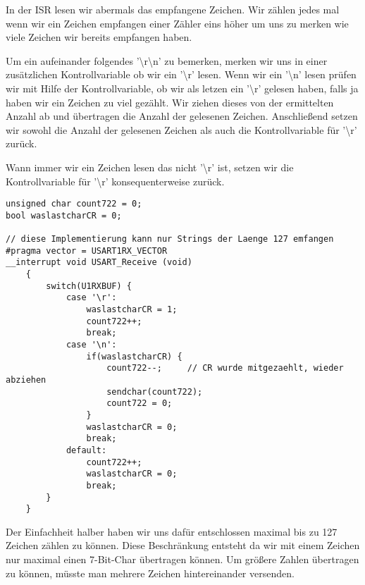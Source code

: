 \documentclass[11pt,a4paper,ngerman]{article}
\begin{document}
\begin{description}
In der ISR lesen wir abermals das empfangene Zeichen. 
Wir zählen jedes mal wenn wir ein Zeichen empfangen einer Zähler eins höher um uns zu merken wie
viele Zeichen wir bereits empfangen haben.

Um ein aufeinander folgendes '\textbackslash r\textbackslash n' zu bemerken, merken wir uns in einer zusätzlichen Kontrollvariable ob wir ein '\textbackslash r' lesen.
Wenn wir ein '\textbackslash n' lesen prüfen wir mit Hilfe der Kontrollvariable, ob wir als letzen ein '\textbackslash r' gelesen haben, falls ja haben wir
ein Zeichen zu viel gezählt. Wir ziehen dieses von der ermittelten Anzahl ab und übertragen die Anzahl der gelesenen 
Zeichen. Anschließend setzen wir sowohl die Anzahl der gelesenen Zeichen als auch die Kontrollvariable für '\textbackslash r' zurück.

Wann immer wir ein Zeichen lesen das nicht '\textbackslash r' ist, setzen wir die Kontrollvariable für '\textbackslash r' konsequenterweise zurück.
\begin{lstlisting}
unsigned char count722 = 0;
bool waslastcharCR = 0;

// diese Implementierung kann nur Strings der Laenge 127 emfangen
#pragma vector = USART1RX_VECTOR
__interrupt void USART_Receive (void)
	{
		switch(U1RXBUF) {
			case '\r':
				waslastcharCR = 1;
				count722++;
				break;
			case '\n':
				if(waslastcharCR) {
					count722--;		// CR wurde mitgezaehlt, wieder abziehen
					sendchar(count722);
					count722 = 0;
				}
				waslastcharCR = 0;
				break;
			default:
				count722++;
				waslastcharCR = 0;
				break;
		}
	} 
\end{lstlisting}
Der Einfachheit halber haben wir uns dafür entschlossen maximal bis zu 127 Zeichen zählen zu können. Diese Beschränkung
entsteht da wir mit einem Zeichen nur maximal einen 7-Bit-Char übertragen können. Um größere Zahlen übertragen zu können,
müsste man mehrere Zeichen hintereinander versenden.
	
\end{description}
\end{document}
